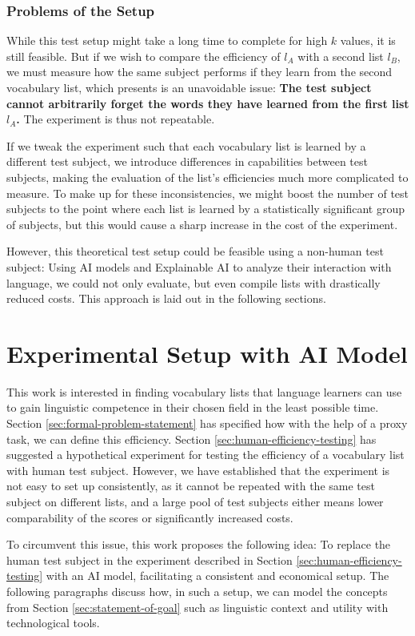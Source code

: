 \subsubsection{Problems of the Setup}
While this test setup might take a long time to complete for high $k$ values, it is still feasible.
But if we wish to compare the efficiency of $l_A$ with a second list $l_B$, we must measure how the same subject performs if they learn from the second vocabulary list, which presents is an unavoidable issue:
\textbf{The test subject cannot arbitrarily forget the words they have learned from the first list $l_A$.}
The experiment is thus not repeatable.

If we tweak the experiment such that each vocabulary list is learned by a different test subject, we introduce differences in capabilities between test subjects, making the evaluation of the list's efficiencies much more complicated to measure.
To make up for these inconsistencies, we might boost the number of test subjects to the point where each list is learned by a statistically significant group of subjects, but this would cause a sharp increase in the cost of the experiment.

However, this theoretical test setup could be feasible using a non-human test subject:
Using AI models and Explainable AI to analyze their interaction with language, we could not only evaluate, but even compile lists with drastically reduced costs.
This approach is laid out in the following sections.

\section{Experimental Setup with AI Model} \label{sec:experimental-setup-with-ai}
This work is interested in finding vocabulary lists that language learners can use to gain linguistic competence in their chosen field in the least possible time.
Section \ref{sec:formal-problem-statement} has specified how with the help of a proxy task, we can define this efficiency.
Section \ref{sec:human-efficiency-testing} has suggested a hypothetical experiment for testing the efficiency of a vocabulary list with human test subject.
However, we have established that the experiment is not easy to set up consistently, as it cannot be repeated with the same test subject on different lists, and a large pool of test subjects either means lower comparability of the scores or significantly increased costs.

To circumvent this issue, this work proposes the following idea:
To replace the human test subject in the experiment described in Section \ref{sec:human-efficiency-testing} with an AI model, facilitating a consistent and economical setup.
The following paragraphs discuss how, in such a setup, we can model the concepts from Section \ref{sec:statement-of-goal} such as linguistic context and utility with technological tools.

